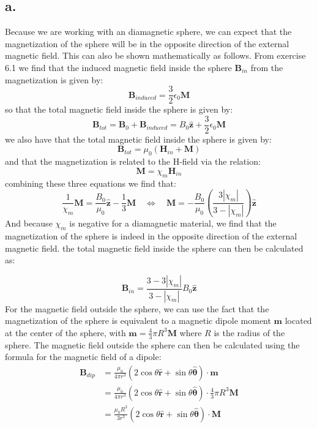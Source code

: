 \documentclass[11pt,a4paper]{article}
\begin{document}
\subsection*{a.}
Because we are working with an diamagnetic sphere, we can expect that the magnetization of the sphere will be in the opposite direction of the external magnetic field. This can also be shown mathematically as follows.
From exercise 6.1 we find that the induced magnetic field inside the sphere $\mathbf{B}_{in}$ from the magnetization is given by:
\[
\mathbf{B}_{induced} = \frac{3}{2}\epsilon_0 \mathbf{M}
\]
so that the total magnetic field inside the sphere is given by:
\[
\mathbf{B}_{tot} = \mathbf{B}_0 + \mathbf{B}_{induced} = B_0\hat{\mathbf{z}} + \frac{3}{2}\epsilon_0 \mathbf{M}
\]
we also have that the total magnetic field inside the sphere is given by:
\[
\mathbf{B}_{tot} = \mu_0(\mathbf{H}_{in}+\mathbf{M})
\]
and that the magnetization is related to the H-field via the relation:
\[
\mathbf{M} = \chi_m \mathbf{H}_{in}
\]
combining these three equations we find that:
\[
\frac{1}{\chi_m}\mathbf{M}=\frac{B_0}{\mu_0}\hat{\mathbf{z}} -\frac{1}{3}\mathbf{M} \quad \Leftrightarrow \quad \boxed{\mathbf{M} = -\frac{B_0}{\mu_0}\left(\frac{3|\chi_m|}{3-|\chi_m|}\right)\hat{\mathbf{z}}}
\]
And because $\chi_m$ is negative for a diamagnetic material, we find that the magnetization of the sphere is indeed in the opposite direction of the external magnetic field. the total magnetic field inside the sphere can then be calculated as:

\[
\boxed{
\mathbf{B}_{in} = \frac{3-3|\chi_m|}{3-|\chi_m|}B_0\hat{\mathbf{z}}
}
\]
For the magnetic field outside the sphere, we can use the fact that the magnetization of the sphere is equivalent to a magnetic dipole moment $\mathbf{m}$ located at the center of the sphere, with $\mathbf{m} = \frac{4}{3}\pi R^3 \mathbf{M}$ where $R$ is the radius of the sphere. The magnetic field outside the sphere can then be calculated using the formula for the magnetic field of a dipole:
\begin{align*}
\mathbf{B}_{dip} &= \frac{\mu_0}{4\pi r^3}\left(2\cos\theta\hat{\mathbf{r}} + \sin\theta\hat{\mathbf{\theta}}\right)\cdot \mathbf{m}\\
&= \frac{\mu_0}{4\pi r^3}\left(2\cos\theta\hat{\mathbf{r}} + \sin\theta\hat{\mathbf{\theta}}\right)\cdot \frac{4}{3}\pi R^3 \mathbf{M}\\
&= \frac{\mu_0 R^3}{3 r^3}\left(2\cos\theta\hat{\mathbf{r}} + \sin\theta\hat{\mathbf{\theta}}\right)\cdot \mathbf{M}
\end{align*}
\end{document}
